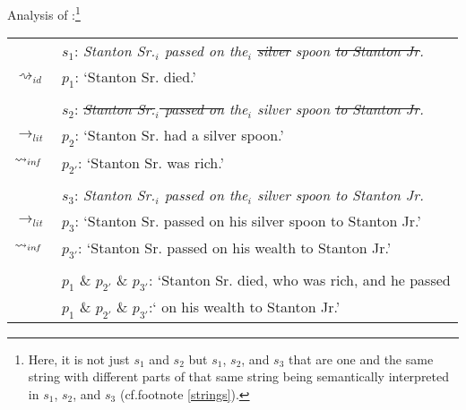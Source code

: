 \documentclass[output=paper]{langsci/langscibook}
\begin{document}
\ea \label{analysis silver spoon ++}
Analysis of :\footnote{Here, it is not just $s_{1}$ and $s_{2}$ but $s_{1}$, $s_{2}$, and $s_{3}$ that are one and the same string with different parts of that same string being semantically interpreted in $s_{1}$, $s_{2}$, and $s_{3}$ (cf.\@ footnote \ref{strings}).} \\
\vspace{5pt}
\begin{tabular}{ll}
								& 	$s_{1}$: \hspace{4pt} \textit{Stanton Sr.$_{i}$ passed on the$_{i}$ \sout{silver} spoon \sout{to Stanton Jr}.} \\
$\rightsquigarrow_{id}$				&	$p_{1}$: \hspace{1pt} `Stanton Sr. died.' \\
\vspace{-5pt} \\
								& 	$s_{2}$: \hspace{4pt} \textit{\sout{Stanton Sr.$_{i}$ passed on} the$_{i}$ silver spoon \sout{to Stanton Jr}.} \\
$\rightarrow_{lit}$					&	$p_{2}$: \hspace{1pt} `Stanton Sr. had a silver spoon.' \\
$\rightsquigarrow_{in\hspace{-0.8pt} f}$	&	$p_{2'}$: \hspace{-1.5pt} `Stanton Sr. was rich.' \\
\vspace{-5pt} \\
								& 	$s_{3}$: \hspace{4pt} \textit{Stanton Sr.$_{i}$ passed on the$_{i}$ silver spoon to Stanton Jr.} \\
$\rightarrow_{lit}$					&	$p_{3}$: \hspace{1pt} `Stanton Sr. passed on his silver spoon to Stanton Jr.' \\
$\rightsquigarrow_{in\hspace{-0.8pt} f}$	&	$p_{3'}$: \hspace{-1.5pt} `Stanton Sr. passed on his wealth to Stanton Jr.' \\
\vspace{-5pt} \\
								&	$p_{1}$ \& $p_{2'}$ \& $p_{3'}$: `Stanton Sr. died, who was rich, and he passed \\
								&	{\white $p_{1}$ \& $p_{2'}$ \& $p_{3'}$:`} on his wealth to Stanton Jr.' \\
\end{tabular}
\z
\end{document}
